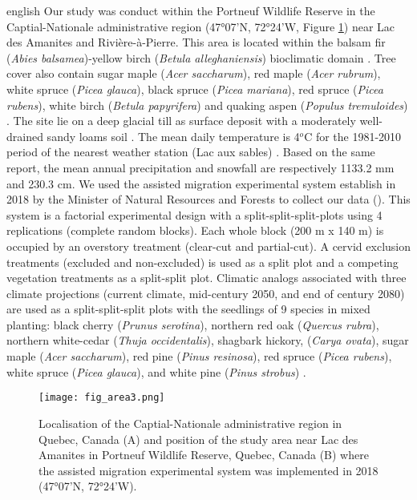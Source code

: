 \begin{otherlanguage*}{english}
  Our study was conduct within the Portneuf Wildlife Reserve in the Captial-Nationale administrative region (47°07'N, 72°24'W, Figure \ref{fig:area}) near Lac des Amanites and Rivière-à-Pierre. 
  This area is located within the balsam fir (\textit{Abies balsamea})-yellow birch (\textit{Betula alleghaniensis}) bioclimatic domain \citep{saucierChapitreEcologieForestiere2009}.
  Tree cover also contain sugar maple (\textit{Acer saccharum}), red maple (\textit{Acer rubrum}), white spruce (\textit{Picea glauca}), black spruce (\textit{Picea mariana}), red spruce (\textit{Picea rubens}), white birch (\textit{Betula papyrifera}) and quaking aspen (\textit{Populus tremuloides}) \citep{olaBelowgroundCarbonStocks2024}. 
  The site lie on a deep glacial till as surface deposit with a moderately well-drained sandy loams soil \citep{CanadianSystemSoil1998}.
  The mean daily temperature is 4$^{o}$C for the 1981-2010 period of the nearest weather station (Lac aux sables) \citep{environmentcanadaCanadianClimateNormals2019}. 
  Based on the same report, the mean annual precipitation and snowfall are respectively 1133.2 mm and 230.3 cm.
  We used the assisted migration experimental system establish in 2018 by the Minister of Natural Resources and Forests to collect our data (\citealp{royoDesiredREgenerationAssisted2023}).
  This system is a factorial experimental design with a split-split-split-plots using 4 replications (complete random blocks). 
  Each whole block (200 m x 140 m) is occupied by an overstory treatment (clear-cut and partial-cut). 
  A cervid exclusion treatments (excluded and non-excluded) is used as a split plot and a competing vegetation treatments as a split-split plot. 
  Climatic analogs associated with three climate projections (current climate, mid-century 2050, and end of century 2080) 
  are used as a split-split-split plots with the seedlings of 9 species in mixed planting: black cherry (\textit{Prunus serotina}), northern red oak (\textit{Quercus rubra}), 
  northern white-cedar (\textit{Thuja occidentalis}), shagbark hickory, (\textit{Carya ovata}), sugar maple (\textit{Acer saccharum}), red pine (\textit{Pinus resinosa}), 
  red spruce (\textit{Picea rubens}), white spruce (\textit{Picea glauca}), and white pine (\textit{Pinus strobus}) \citep{royoDesiredREgenerationAssisted2023}.

\end{otherlanguage*}

\begin{figure}[ht!]
	\centering
	\texttt{[image: fig\_area3.png]}
	\caption[Localisation of the Captial-Nationale administrative region in Quebec, Canada and position of the study area near Lac des Amanites in Portneuf Wildlife Reserve, Quebec, Canada.]
  {Localisation of the Captial-Nationale administrative region in Quebec, Canada (A) and position of the study area near Lac des Amanites in Portneuf Wildlife Reserve, Quebec, Canada (B) where the assisted migration experimental system was implemented in 2018 (47°07'N, 72°24'W).}
	\label{fig:area}
	\end{figure}  



